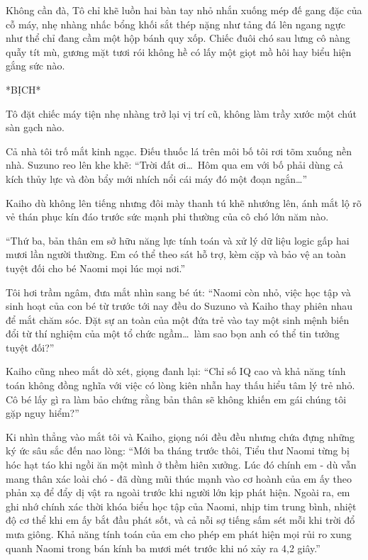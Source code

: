 \documentclass[../main.tex]{subfiles}
\begin{document}
Không cần đà, Tô chỉ khẽ luồn hai bàn tay nhỏ nhắn xuống mép đế gang đặc của cỗ máy, nhẹ nhàng nhấc bổng khối sắt thép nặng như tảng đá lên ngang ngực như thể chỉ đang cầm một hộp bánh quy xốp. Chiếc đuôi chó sau lưng cô nàng quẫy tít mù, gương mặt tươi rói không hề có lấy một giọt mồ hôi hay biểu hiện gắng sức nào.

*BỊCH*

Tô đặt chiếc máy tiện nhẹ nhàng trở lại vị trí cũ, không làm trầy xước một chút sàn gạch nào.

Cả nhà tôi trố mắt kinh ngạc. Điếu thuốc lá trên môi bố tôi rơi tõm xuống nền nhà. Suzuno reo lên khe khẽ: ``Trời đất ơi\dots\ Hôm qua em với bố phải dùng cả kích thủy lực và đòn bẩy mới nhích nổi cái máy đó một đoạn ngắn\dots''

Kaiho dù không lên tiếng nhưng đôi mày thanh tú khẽ nhướng lên, ánh mắt lộ rõ vẻ thán phục kín đáo trước sức mạnh phi thường của cô chó lớn năm nào.

``Thứ ba, bản thân em sở hữu năng lực tính toán và xử lý dữ liệu logic gấp hai mươi lần người thường. Em có thể theo sát hỗ trợ, kèm cặp và bảo vệ an toàn tuyệt đối cho bé Naomi mọi lúc mọi nơi.''

Tôi hơi trầm ngâm, đưa mắt nhìn sang bé út: ``Naomi còn nhỏ, việc học tập và sinh hoạt của con bé từ trước tới nay đều do Suzuno và Kaiho thay phiên nhau để mắt chăm sóc. Đặt sự an toàn của một đứa trẻ vào tay một sinh mệnh biến đổi từ thí nghiệm của một tổ chức ngầm\dots\ làm sao bọn anh có thể tin tưởng tuyệt đối?''

Kaiho cũng nheo mắt dò xét, giọng đanh lại: ``Chỉ số IQ cao và khả năng tính toán không đồng nghĩa với việc có lòng kiên nhẫn hay thấu hiểu tâm lý trẻ nhỏ. Cô bé lấy gì ra làm bảo chứng rằng bản thân sẽ không khiến em gái chúng tôi gặp nguy hiểm?''

Ki nhìn thẳng vào mắt tôi và Kaiho, giọng nói đều đều nhưng chứa đựng những ký ức sâu sắc đến nao lòng: ``Mới ba tháng trước thôi, Tiểu thư Naomi từng bị hóc hạt táo khi ngồi ăn một mình ở thềm hiên xưởng. Lúc đó chính em - dù vẫn mang thân xác loài chó - đã dùng mũi thúc mạnh vào cơ hoành của em ấy theo phản xạ để đẩy dị vật ra ngoài trước khi người lớn kịp phát hiện. Ngoài ra, em ghi nhớ chính xác thời khóa biểu học tập của Naomi, nhịp tim trung bình, nhiệt độ cơ thể khi em ấy bắt đầu phát sốt, và cả nỗi sợ tiếng sấm sét mỗi khi trời đổ mưa giông. Khả năng tính toán của em cho phép em phát hiện mọi rủi ro xung quanh Naomi trong bán kính ba mươi mét trước khi nó xảy ra 4,2 giây.''
\end{document}

